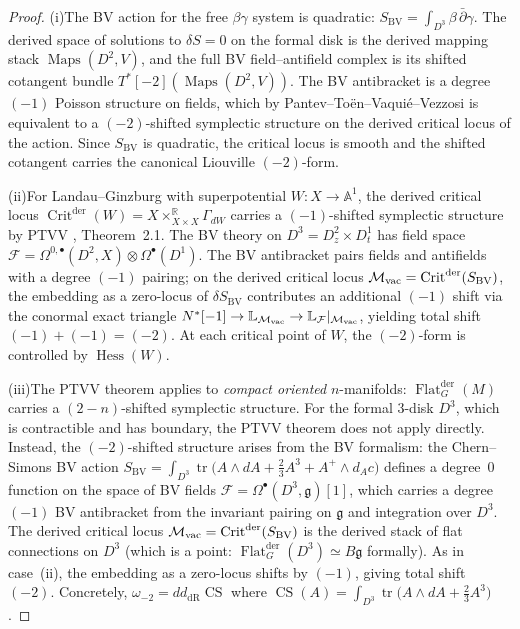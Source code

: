 \begin{proof}
(i)\enspace The BV action for the free $\beta\gamma$ system is
quadratic: $S_{\mathrm{BV}} = \int_{D^3} \beta\, \bar\partial\gamma$.
The derived space of solutions to $\delta S = 0$ on the formal disk
is the derived mapping stack $\operatorname{Maps}(D^2, V)$, and the
full BV field--antifield complex is its shifted cotangent bundle
$T^*[-2](\operatorname{Maps}(D^2, V))$. The BV antibracket is a
degree $(-1)$ Poisson structure on fields, which by
Pantev--To\"en--Vaqui\'e--Vezzosi \cite{PTVV13} is equivalent to a
$(-2)$-shifted symplectic structure on the derived critical locus of
the action. Since $S_{\mathrm{BV}}$ is quadratic, the critical locus
is smooth and the shifted cotangent carries the canonical Liouville
$(-2)$-form.

(ii)\enspace For Landau--Ginzburg with superpotential $W \colon X \to
\mathbb{A}^1$, the derived critical locus
$\operatorname{Crit}^{\mathrm{der}}(W) = X
\times^{\mathbb{R}}_{X \times X} \Gamma_{dW}$ carries a
$(-1)$-shifted symplectic structure by PTVV \cite{PTVV13},
Theorem~2.1. The BV theory on $D^3 = D^2_z \times D^1_t$
has field space $\mathcal{F} = \Omega^{0,\bullet}(D^2, X) \otimes
\Omega^\bullet(D^1)$. The BV antibracket pairs fields and
antifields with a degree $(-1)$ pairing; on the derived critical
locus $\mathcal M_{\mathrm{vac}} =
\operatorname{Crit}^{\mathrm{der}}(S_{\mathrm{BV}})$, the
embedding as a zero-locus of $\delta S_{\mathrm{BV}}$ contributes
an additional $(-1)$ shift via the conormal exact triangle
$N^*[-1] \to \mathbb{L}_{\mathcal M_{\mathrm{vac}}} \to
\mathbb{L}_{\mathcal{F}}|_{\mathcal M_{\mathrm{vac}}}$, yielding total
shift $(-1)+(-1) = (-2)$. At each critical point of $W$, the
$(-2)$-form is controlled by $\operatorname{Hess}(W)$.

(iii)\enspace The PTVV theorem \cite{PTVV13} applies to
\emph{compact oriented} $n$-manifolds: $\operatorname{Flat}_G^{\mathrm{der}}(M)$
carries a $(2-n)$-shifted symplectic structure. For the formal
$3$-disk $D^3$, which is contractible and has boundary, the PTVV
theorem does not apply directly. Instead, the $(-2)$-shifted
structure arises from the BV formalism: the Chern--Simons BV
action $S_{\mathrm{BV}} = \int_{D^3} \operatorname{tr}\bigl(A
\wedge dA + \tfrac{2}{3}A^3 + A^+ \wedge d_A c\bigr)$ defines a
degree~$0$ function on the space of BV fields $\mathcal{F} =
\Omega^\bullet(D^3, \mathfrak{g})[1]$, which carries a degree
$(-1)$ BV antibracket from the invariant pairing on $\mathfrak{g}$
and integration over $D^3$. The derived critical locus
$\mathcal M_{\mathrm{vac}} = \operatorname{Crit}^{\mathrm{der}}(S_{\mathrm{BV}})$
is the derived stack of flat connections on $D^3$
(which is a point: $\operatorname{Flat}_G^{\mathrm{der}}(D^3)
\simeq B\mathfrak{g}$ formally). As in case~(ii), the embedding
as a zero-locus shifts by $(-1)$, giving total shift $(-2)$.
Concretely, $\omega_{-2} = dd_{\mathrm{dR}} \operatorname{CS}$
where $\operatorname{CS}(A) = \int_{D^3}
\operatorname{tr}\bigl(A \wedge dA + \tfrac{2}{3} A^3\bigr)$.
\end{proof}


